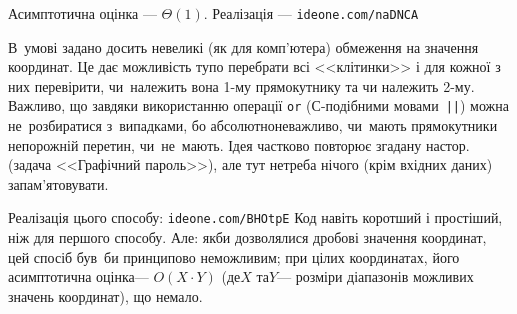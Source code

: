 Асимптотична оцінка --- $\Theta(1)$. Реалізація --- \verb"ideone.com/naDNCA"


В~умові задано досить невеликі (як для комп’ютера) обмеження на значення координат. Це дає можливість тупо перебрати всі <<клітинки>> і для кожної з них перевірити, чи~належить вона \mbox{1-му} прямокутнику та чи належить \mbox{2-му}. Важливо, що завдяки використанню операції \texttt{or} (\mbox{С-подіб}\-ними мовами~\verb"||") можна не~розбиратися з~випадками, бо абсолютно\nolinebreak[2] не\nolinebreak[3] важливо, чи~мають прямокутники непорожній перетин, чи~не~мають.
Ідея частково повторює згадану на\nolinebreak[3] стор.~\pageref{text:drawing-by-coords-in-graphics-password-problem} (задача <<Графічний пароль>>), але тут не\nolinebreak[3] треба нічого (крім вхідних даних) запам'ятовувати.

Реалізація цього способу: \verb"ideone.com/BHOtpE"\hspace{0.5em plus 1em}
Код навіть коротший і простіший, ніж для першого способу. Але: якби дозволялися дробові значення координат, цей спосіб був~би принципово неможливим; при цілих координатах, його асимптотична оцінка\nolinebreak[3] --- $O(X\cdot{}Y)$ (де\nolinebreak[2] $X$ та\nolinebreak[3] $Y$\nolinebreak[3] --- розміри діапазонів можливих значень координат), що немало.
